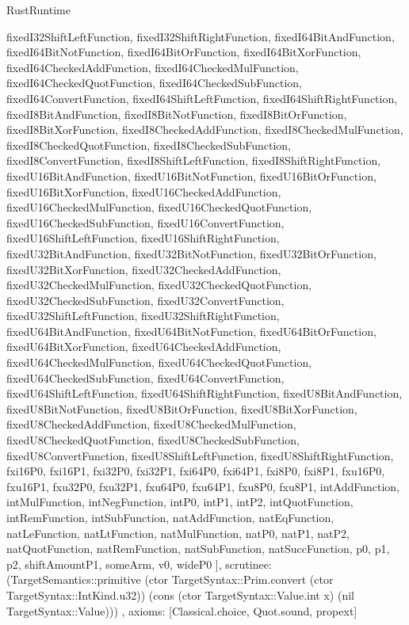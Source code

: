 \begin{lexlean}{RustRuntime}
\begin{semanticmodule}
{{      fixedI32ShiftLeftFunction,
      fixedI32ShiftRightFunction,
      fixedI64BitAndFunction,
      fixedI64BitNotFunction,
      fixedI64BitOrFunction,
      fixedI64BitXorFunction,
      fixedI64CheckedAddFunction,
      fixedI64CheckedMulFunction,
      fixedI64CheckedQuotFunction,
      fixedI64CheckedSubFunction,
      fixedI64ConvertFunction,
      fixedI64ShiftLeftFunction,
      fixedI64ShiftRightFunction,
      fixedI8BitAndFunction,
      fixedI8BitNotFunction,
      fixedI8BitOrFunction,
      fixedI8BitXorFunction,
      fixedI8CheckedAddFunction,
      fixedI8CheckedMulFunction,
      fixedI8CheckedQuotFunction,
      fixedI8CheckedSubFunction,
      fixedI8ConvertFunction,
      fixedI8ShiftLeftFunction,
      fixedI8ShiftRightFunction,
      fixedU16BitAndFunction,
      fixedU16BitNotFunction,
      fixedU16BitOrFunction,
      fixedU16BitXorFunction,
      fixedU16CheckedAddFunction,
      fixedU16CheckedMulFunction,
      fixedU16CheckedQuotFunction,
      fixedU16CheckedSubFunction,
      fixedU16ConvertFunction,
      fixedU16ShiftLeftFunction,
      fixedU16ShiftRightFunction,
      fixedU32BitAndFunction,
      fixedU32BitNotFunction,
      fixedU32BitOrFunction,
      fixedU32BitXorFunction,
      fixedU32CheckedAddFunction,
      fixedU32CheckedMulFunction,
      fixedU32CheckedQuotFunction,
      fixedU32CheckedSubFunction,
      fixedU32ConvertFunction,
      fixedU32ShiftLeftFunction,
      fixedU32ShiftRightFunction,
      fixedU64BitAndFunction,
      fixedU64BitNotFunction,
      fixedU64BitOrFunction,
      fixedU64BitXorFunction,
      fixedU64CheckedAddFunction,
      fixedU64CheckedMulFunction,
      fixedU64CheckedQuotFunction,
      fixedU64CheckedSubFunction,
      fixedU64ConvertFunction,
      fixedU64ShiftLeftFunction,
      fixedU64ShiftRightFunction,
      fixedU8BitAndFunction,
      fixedU8BitNotFunction,
      fixedU8BitOrFunction,
      fixedU8BitXorFunction,
      fixedU8CheckedAddFunction,
      fixedU8CheckedMulFunction,
      fixedU8CheckedQuotFunction,
      fixedU8CheckedSubFunction,
      fixedU8ConvertFunction,
      fixedU8ShiftLeftFunction,
      fixedU8ShiftRightFunction,
      fxi16P0,
      fxi16P1,
      fxi32P0,
      fxi32P1,
      fxi64P0,
      fxi64P1,
      fxi8P0,
      fxi8P1,
      fxu16P0,
      fxu16P1,
      fxu32P0,
      fxu32P1,
      fxu64P0,
      fxu64P1,
      fxu8P0,
      fxu8P1,
      intAddFunction,
      intMulFunction,
      intNegFunction,
      intP0,
      intP1,
      intP2,
      intQuotFunction,
      intRemFunction,
      intSubFunction,
      natAddFunction,
      natEqFunction,
      natLeFunction,
      natLtFunction,
      natMulFunction,
      natP0,
      natP1,
      natP2,
      natQuotFunction,
      natRemFunction,
      natSubFunction,
      natSuccFunction,
      p0,
      p1,
      p2,
      shiftAmountP1,
      someArm,
      v0,
      wideP0
    ],
    scrutinee: (TargetSemantics::primitive (ctor TargetSyntax::Prim.convert (ctor TargetSyntax::IntKind.u32)) (cons (ctor TargetSyntax::Value.int x) (nil TargetSyntax::Value)))
  },
  axioms: [Classical.choice, Quot.sound, propext]
}


\end{semanticmodule}
\end{lexlean}
